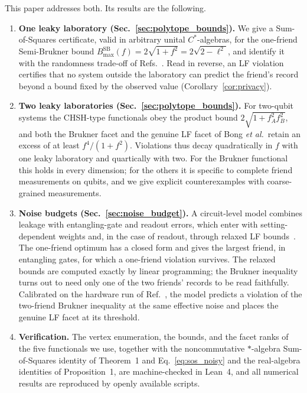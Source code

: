 This paper addresses both. Its results are the following.
\begin{enumerate}
    \item \textbf{One leaky laboratory (Sec.~\ref{sec:polytope_bounds}).} We give a Sum-of-Squares certificate, valid in arbitrary unital $C^*$-algebras, for the one-friend Semi-Brukner bound $B_{\max}^{\mathrm{SB}}(f) = 2\sqrt{1 + f^2} = 2\sqrt{2 - \ell^2}$, and identify it with the randomness trade-off of Refs.~\cite{pironio2010,masanes2011,acin2012}. Read in reverse, an LF violation certifies that no system outside the laboratory can predict the friend's record beyond a bound fixed by the observed value (Corollary~\ref{cor:privacy}).
    \item \textbf{Two leaky laboratories (Sec.~\ref{sec:polytope_bounds}).} For two-qubit systems the CHSH-type functionals obey the product bound $2\sqrt{1 + f_A^2 f_B^2}$, and both the Brukner facet and the genuine LF facet of Bong \emph{et al.}\ retain an excess of at least $f^4/(1 + f^2)$. Violations thus decay quadratically in $f$ with one leaky laboratory and quartically with two. For the Brukner functional this holds in every dimension; for the others it is specific to complete friend measurements on qubits, and we give explicit counterexamples with coarse-grained measurements.
    \item \textbf{Noise budgets (Sec.~\ref{sec:noise_budget}).} A circuit-level model combines leakage with entangling-gate and readout errors, which enter with setting-dependent weights and, in the case of readout, through relaxed LF bounds~\cite{moreno2022,laux2026}. The one-friend optimum has a closed form and gives the largest friend, in entangling gates, for which a one-friend violation survives. The relaxed bounds are computed exactly by linear programming; the Brukner inequality turns out to need only one of the two friends' records to be read faithfully. Calibrated on the hardware run of Ref.~\cite{laux2026}, the model predicts a violation of the two-friend Brukner inequality at the same effective noise and places the genuine LF facet at its threshold.
    \item \textbf{Verification.} The vertex enumeration, the bounds, and the facet ranks of the five functionals we use, together with the noncommutative $*$-algebra Sum-of-Squares identity of Theorem~1 and Eq.~\eqref{eq:sos_noisy} and the real-algebra identities of Proposition~1, are machine-checked in Lean~4, and all numerical results are reproduced by openly available scripts.
\end{enumerate}

